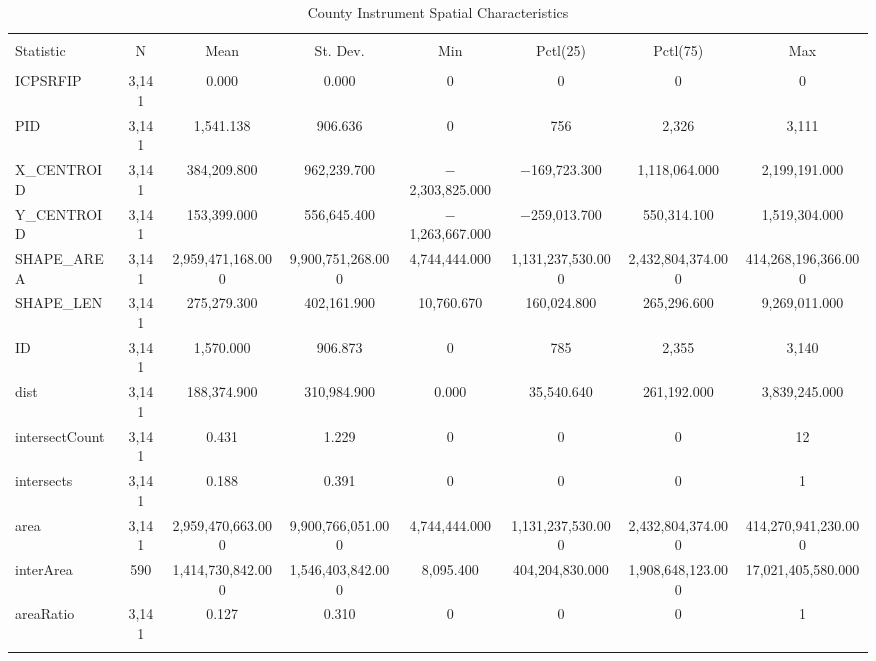 
\begin{table}[!htbp] \centering 
  \caption{County Instrument Spatial Characteristics} 
  \label{} 
\scriptsize 
\begin{tabular}{@{\extracolsep{5pt}}lccccccc} 
\\[-1.8ex]\hline 
\hline \\[-1.8ex] 
Statistic & \multicolumn{1}{c}{N} & \multicolumn{1}{c}{Mean} & \multicolumn{1}{c}{St. Dev.} & \multicolumn{1}{c}{Min} & \multicolumn{1}{c}{Pctl(25)} & \multicolumn{1}{c}{Pctl(75)} & \multicolumn{1}{c}{Max} \\ 
\hline \\[-1.8ex] 
ICPSRFIP & 3,141 & 0.000 & 0.000 & 0 & 0 & 0 & 0 \\ 
PID & 3,141 & 1,541.138 & 906.636 & 0 & 756 & 2,326 & 3,111 \\ 
X\_CENTROID & 3,141 & 384,209.800 & 962,239.700 & $-$2,303,825.000 & $-$169,723.300 & 1,118,064.000 & 2,199,191.000 \\ 
Y\_CENTROID & 3,141 & 153,399.000 & 556,645.400 & $-$1,263,667.000 & $-$259,013.700 & 550,314.100 & 1,519,304.000 \\ 
SHAPE\_AREA & 3,141 & 2,959,471,168.000 & 9,900,751,268.000 & 4,744,444.000 & 1,131,237,530.000 & 2,432,804,374.000 & 414,268,196,366.000 \\ 
SHAPE\_LEN & 3,141 & 275,279.300 & 402,161.900 & 10,760.670 & 160,024.800 & 265,296.600 & 9,269,011.000 \\ 
ID & 3,141 & 1,570.000 & 906.873 & 0 & 785 & 2,355 & 3,140 \\ 
dist & 3,141 & 188,374.900 & 310,984.900 & 0.000 & 35,540.640 & 261,192.000 & 3,839,245.000 \\ 
intersectCount & 3,141 & 0.431 & 1.229 & 0 & 0 & 0 & 12 \\ 
intersects & 3,141 & 0.188 & 0.391 & 0 & 0 & 0 & 1 \\ 
area & 3,141 & 2,959,470,663.000 & 9,900,766,051.000 & 4,744,444.000 & 1,131,237,530.000 & 2,432,804,374.000 & 414,270,941,230.000 \\ 
interArea & 590 & 1,414,730,842.000 & 1,546,403,842.000 & 8,095.400 & 404,204,830.000 & 1,908,648,123.000 & 17,021,405,580.000 \\ 
areaRatio & 3,141 & 0.127 & 0.310 & 0 & 0 & 0 & 1 \\ 
\hline \\[-1.8ex] 
\end{tabular} 
\end{table} 
